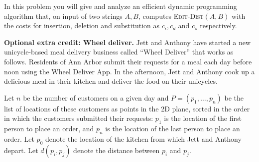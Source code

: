 \documentclass[11pt,addpoints]{exam}
\begin{document}
\begin{questions}
  In this problem you will give and analyze an efficient dynamic programming algorithm that, on input of two strings $A, B$, computes \textsc{Edit-Dist}$(A,B)$ with the costs for insertion, deletion and substitution as $c_i,c_d$ and $c_s$ respectively.



  \bonusquestion[3] \textbf{Optional extra credit: Wheel deliver.}
  \nopagebreak
  Jett and Anthony have started a new unicycle-based meal delivery business called ``Wheel Deliver'' that works as follows.
  Residents of Ann Arbor submit their requests for a meal each day before noon using the Wheel Deliver App.
  In the afternoon, Jett and Anthony cook up a delicious meal in their kitchen and deliver the food on their unicycles.
		
  Let $n$ be the number of customers on a given day and $P = (p_1, \dots, p_n)$ be the list of locations of these customers as points in the 2D plane, sorted in the order in which the customers submitted their requests: $p_1$ is the location of the first person to place an order, and $p_n$ is the location of the last person to place an order.
  Let $p_0$ denote the location of the kitchen from which Jett and Anthony depart.
  Let $d(p_i,p_ j)$ denote the distance between $p_i$ and $p_j$.
		

\end{questions}
\end{document}
